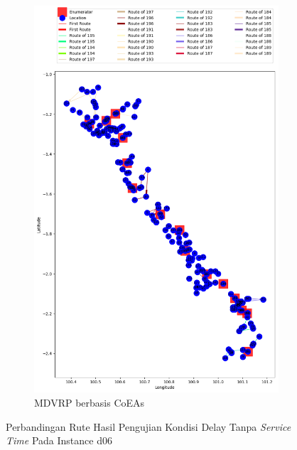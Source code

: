 \begin{figure}[H]
	\centering
	\begin{subfigure}[t]{\textwidth}
		\centering
		\includegraphics[width=\textwidth]{Resources/Images/delayed_6/real_m15_n100_delayed_6_coes}
		\caption{MDVRP berbasis CoEAs}
		\label{fig:real_m15_n100_delayed_6_coes}
	\end{subfigure}
	\caption{Perbandingan Rute Hasil Pengujian Kondisi Delay Tanpa \textit{Service Time} Pada Instance d06}
	\label{fig:real_m15_n100_delayed_6}
\end{figure}


